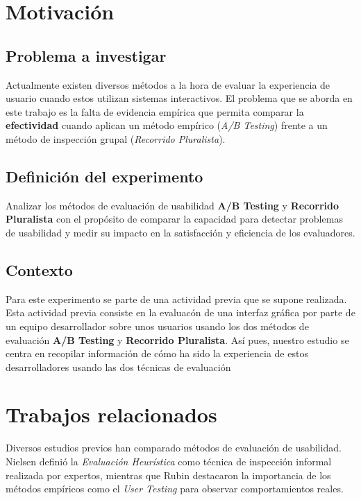 \documentclass[a4paper,12pt]{report}
\begin{document}
\chapter{Motivación}

\section{Problema a investigar}
Actualmente existen diversos métodos a la hora de evaluar la experiencia de usuario cuando estos utilizan sistemas interactivos. El problema que se aborda en este trabajo es la falta de evidencia empírica que permita comparar la \textbf{efectividad} cuando aplican un método empírico (\textit{A/B Testing}) frente a un método de inspección grupal (\textit{Recorrido Pluralista}).

\section{Definición del experimento}
Analizar los métodos de evaluación de usabilidad \textbf{A/B Testing} y \textbf{Recorrido Pluralista} con el propósito de comparar la capacidad para detectar problemas de usabilidad y medir su impacto en la satisfacción y eficiencia de los evaluadores.


\section{Contexto}
Para este experimento se parte de una actividad previa que se supone realizada. Esta actividad previa consiste en la evaluacón de una interfaz gráfica por parte de un equipo desarrollador sobre unos usuarios usando los dos métodos de evaluación \textbf{A/B Testing} y \textbf{Recorrido Pluralista}. Así pues, nuestro estudio se centra en recopilar información de cómo ha sido la experiencia de estos desarrolladores usando las dos técnicas de evaluación

\chapter{Trabajos relacionados}

Diversos estudios previos han comparado métodos de evaluación de usabilidad. Nielsen \cite{nielsen1994usability} definió la \textit{Evaluación Heurística} como técnica de inspección informal realizada por expertos, mientras que Rubin \cite{rubin2011handbook} destacaron la importancia de los métodos empíricos como el \textit{User Testing} para observar comportamientos reales.  
\end{document}
